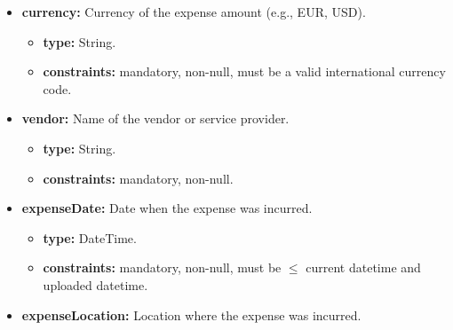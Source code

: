 \begin{itemize} [leftmargin=0.75cm, noitemsep, label=\textbullet]
\begin{itemize} [leftmargin=0.75cm, noitemsep, label=$\circ$]
        \item \textbf{type:} Decimal.

        \item \textbf{constraints:} mandatory, non-null, must be $\geq 0$.

    \end{itemize}

    \item \textbf{currency:} Currency of the expense amount (e.g., EUR, USD).
    
    \begin{itemize} [leftmargin=0.75cm, noitemsep, label=$\circ$]

        \item \textbf{type:} String.

        \item \textbf{constraints:} mandatory, non-null, must be a valid international currency code.

    \end{itemize}

    \item \textbf{vendor:} Name of the vendor or service provider.
    
    \begin{itemize} [leftmargin=0.75cm, noitemsep, label=$\circ$]

        \item \textbf{type:} String.

        \item \textbf{constraints:} mandatory, non-null.

    \end{itemize}

    \item \textbf{expenseDate:} Date when the expense was incurred.
    
    \begin{itemize} [leftmargin=0.75cm, noitemsep, label=$\circ$]

        \item \textbf{type:} DateTime.

        \item \textbf{constraints:} mandatory, non-null, must be $\leq$ current datetime and uploaded datetime.

    \end{itemize}

    \item \textbf{expenseLocation:} Location where the expense was incurred.
    

\end{itemize}
